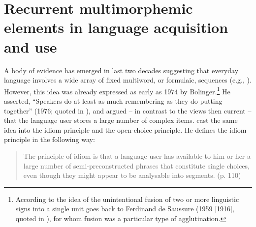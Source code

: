 \section{Recurrent multimorphemic elements in language acquisition and use}

A body of evidence has emerged in last two decades suggesting that everyday language involves a wide array of fixed multiword, or formulaic, sequences (e.g., \citealt{corrigan-etal-2009,schmitt2004,wray-2002,wray-2008,taylor-mental-2012}). However, this idea was already expressed as early as 1974 by Bolinger.\footnote{According to \citet{tremblay-etal11} the idea of the unintentional fusion of two or more linguistic signs into a single unit goes back to Ferdinand de Saussure (1959 [1916], quoted in \citealt[571]{tremblay-etal11}), for whom fusion was a particular type of agglutination.} He asserted, ``Speakers do at least as much remembering as they do putting together'' (1976; quoted in \citealt[29]{erman-warren-2000}), and argued -- in contrast to the views then current -- that the language user stores a large number of complex items. \citet{sinclair-1991} cast the same idea into the idiom principle and the open-choice principle. He defines the idiom principle in the following way:

\begin{quote}
The principle of idiom is that a language user has available to him or her a large number of semi-preconstructed phrases that constitute single choices, even though they might appear to be analysable into segments. (p. 110)
\end{quote}

